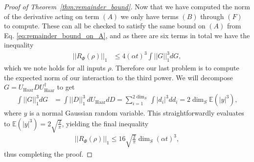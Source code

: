 \documentclass{article}
\newcommand{\matt}[1]{\todo[color=red!50, prepend, caption={Matt}, tickmarkheight=0.25cm]{#1}}
\newcommand{\abs}[1]{\left| #1 \right|}
\newcommand{\norm}[1]{\left|\left| #1 \right|\right|}
\begin{document}
\begin{proof}[Proof of Theorem~\ref{thm:remainder_bound}]
Now that we have computed the norm of the derivative acting on term $(A)$ we only have terms $(B)$ through $(F)$ to compute. These can all be checked to satisfy the same bound on $(A)$ from Eq. \eqref{eq:remainder_bound_on_A}, and as there are six terms in total we have the inequality
\begin{align}
    \norm{R_{\Phi}(\rho)}_1 &\le 4 (\alpha t)^3 \int \norm{G}_1^3 dG,
\end{align}
which we note holds for all inputs $\rho$. Therefore our last problem is to compute the expected norm of our interaction to the third power. We will decompose $G = U_{\text{Haar}} D U_{\text{Haar}}^\dagger $ to get
\begin{align}
    \int \norm{G}_1^3 dG &= \int \norm{D}_1^3 ~ dU_{\text{Haar}} dD = \sum_{i = 1}^{2 \dim_S} \int \abs{d_i}^3 dd_i = 2 \dim_S \mathbb{E}(\abs{y}^3),
\end{align}
where $y$ is a normal Gaussian random variable. This straightforwardly evaluates to $\mathbb{E}( |y|^3) = 2\sqrt{ \frac{2}{\pi}}$, yielding the final inequality
\begin{align}
    \norm{R_{\Phi}(\rho)}_1 \le 16 \sqrt{\frac{2}{\pi}} \dim_S (\alpha t)^3 ,
\end{align}
thus completing the proof.
\end{proof}
\end{document}
